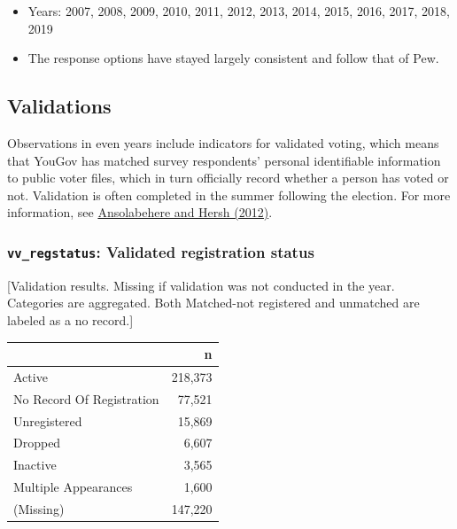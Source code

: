 \documentclass[10pt,article,oneside]{memoir}
\theoremstyle{definition}
\begin{document}
\begin{itemize}
\tightlist
\item
  Years: 2007, 2008, 2009, 2010, 2011, 2012, 2013, 2014, 2015, 2016,
  2017, 2018, 2019
\item
  The response options have stayed largely consistent and follow that of
  Pew.
\end{itemize}

\newpage

\hypertarget{validations}{%
\subsection{Validations}\label{validations}}

Observations in even years include indicators for validated voting,
which means that YouGov has matched survey respondents' personal
identifiable information to public voter files, which in turn officially
record whether a person has voted or not. Validation is often completed
in the summer following the election. For more information, see
\href{https://doi.org/10.1093/pan/mps023}{Ansolabehere and Hersh
(2012)}.

\hypertarget{vv_regstatus-validated-registration-status}{%
\subsubsection{\texorpdfstring{\texttt{vv\_regstatus}: Validated
registration
status}{vv\_regstatus: Validated registration status}}\label{vv_regstatus-validated-registration-status}}

{[}Validation results. Missing if validation was not conducted in the
year. Categories are aggregated. Both Matched-not registered and
unmatched are labeled as a no record.{]}

\begin{table}[H]
\centering
\begin{tabular}{lr}
\toprule
 & n\\
\midrule
Active & 218,373\\
No Record Of Registration & 77,521\\
Unregistered & 15,869\\
Dropped & 6,607\\
Inactive & 3,565\\
Multiple Appearances & 1,600\\
(Missing) & 147,220\\
\bottomrule
\end{tabular}
\end{table}
\end{document}
